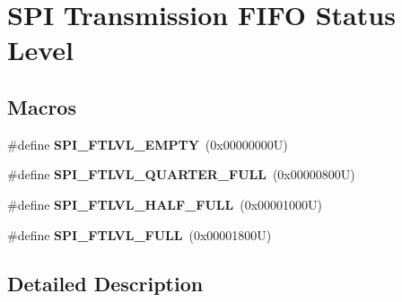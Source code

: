 \hypertarget{group___s_p_i__transmission__fifo__status__level}{}\section{S\+PI Transmission F\+I\+FO Status Level}
\label{group___s_p_i__transmission__fifo__status__level}
\subsection*{Macros}
\begin{DoxyCompactItemize}
\item 
\mbox{\label{group___s_p_i__transmission__fifo__status__level_gab9b0d7e2ab72c8ea98643791effa0576}} 
\#define {\bfseries S\+P\+I\+\_\+\+F\+T\+L\+V\+L\+\_\+\+E\+M\+P\+TY}~(0x00000000\+U)
\item 
\mbox{\label{group___s_p_i__transmission__fifo__status__level_ga039713282e09cee7d70416ffc376b0e2}} 
\#define {\bfseries S\+P\+I\+\_\+\+F\+T\+L\+V\+L\+\_\+\+Q\+U\+A\+R\+T\+E\+R\+\_\+\+F\+U\+LL}~(0x00000800\+U)
\item 
\mbox{\label{group___s_p_i__transmission__fifo__status__level_ga24ec0c2f3fbab8659495c7034f7488fc}} 
\#define {\bfseries S\+P\+I\+\_\+\+F\+T\+L\+V\+L\+\_\+\+H\+A\+L\+F\+\_\+\+F\+U\+LL}~(0x00001000\+U)
\item 
\mbox{\label{group___s_p_i__transmission__fifo__status__level_gafb4f8ba450a3df2f7a5586e3fb89c60d}} 
\#define {\bfseries S\+P\+I\+\_\+\+F\+T\+L\+V\+L\+\_\+\+F\+U\+LL}~(0x00001800\+U)
\end{DoxyCompactItemize}


\subsection{Detailed Description}
